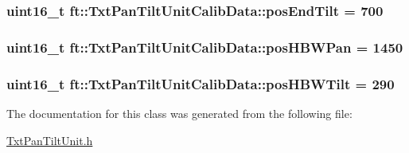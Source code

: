 \subsubsection[{\texorpdfstring{pos\+End\+Tilt}{posEndTilt}}]{\setlength{\rightskip}{0pt plus 5cm}uint16\+\_\+t ft\+::\+Txt\+Pan\+Tilt\+Unit\+Calib\+Data\+::pos\+End\+Tilt = 700}\hypertarget{classft_1_1_txt_pan_tilt_unit_calib_data_adf113240ac0f46355d5fc8738ca8543b}{}\label{classft_1_1_txt_pan_tilt_unit_calib_data_adf113240ac0f46355d5fc8738ca8543b}
\subsubsection[{\texorpdfstring{pos\+H\+B\+W\+Pan}{posHBWPan}}]{\setlength{\rightskip}{0pt plus 5cm}uint16\+\_\+t ft\+::\+Txt\+Pan\+Tilt\+Unit\+Calib\+Data\+::pos\+H\+B\+W\+Pan = 1450}\hypertarget{classft_1_1_txt_pan_tilt_unit_calib_data_a25e9ed80a6171dd57bf919b0a2cf4975}{}\label{classft_1_1_txt_pan_tilt_unit_calib_data_a25e9ed80a6171dd57bf919b0a2cf4975}
\subsubsection[{\texorpdfstring{pos\+H\+B\+W\+Tilt}{posHBWTilt}}]{\setlength{\rightskip}{0pt plus 5cm}uint16\+\_\+t ft\+::\+Txt\+Pan\+Tilt\+Unit\+Calib\+Data\+::pos\+H\+B\+W\+Tilt = 290}\hypertarget{classft_1_1_txt_pan_tilt_unit_calib_data_a7f5468dcbb30dd4c6205603facb9d84d}{}\label{classft_1_1_txt_pan_tilt_unit_calib_data_a7f5468dcbb30dd4c6205603facb9d84d}


The documentation for this class was generated from the following file\+:\begin{DoxyCompactItemize}
\item 
\hyperlink{_txt_pan_tilt_unit_8h}{Txt\+Pan\+Tilt\+Unit.\+h}\end{DoxyCompactItemize}

